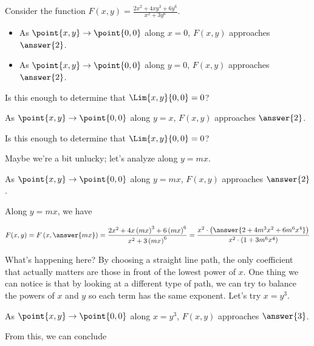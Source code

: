 \documentclass{ximera}
\author{Jim Talamo}
\begin{document}
\begin{exercise}
  Consider the function $F(x,y)= \frac{2x^2+4xy^3+6y^6}{x^2+3y^6}$.
  
  \begin{itemize}
  \item As $\point{x,y} \to \point{0,0}$ along $x=0$, $F(x,y)$ approaches $\answer{2}$.
  \item As $\point{x,y} \to \point{0,0}$ along $y=0$, $F(x,y)$ approaches $\answer{2}$.
  \end{itemize}
  
Is this enough to determine that $\Lim{x,y}{0,0} = 0$? 
   
   \begin{exercise}
As $\point{x,y} \to \point{0,0}$ along $y=x$, $F(x,y)$ approaches $\answer{2}$.
   
  Is this enough to determine that $\Lim{x,y}{0,0} = 0$? 
      
\begin{exercise}
Maybe we're a bit unlucky; let's analyze along $y=mx$.  

As $\point{x,y} \to \point{0,0}$ along $y=mx$, $F(x,y)$ approaches $\answer{2}$.

\begin{hint}
Along $y=mx$, we have 

\[
F(x,y)= F\left(x,\answer{mx}\right) = \frac{2x^2+4x\left(mx\right)^3+6\left(mx\right)^6}{x^2+3\left(mx\right)^6} = \frac{x^2 \cdot \left(\answer{2+4m^3x^2+6m^6x^4} \right) }{x^2 \cdot \left(1 +3m^6x^4 \right) }
\]
\end{hint}
\begin{exercise}

What's happening here?  By choosing a straight line path, the only coefficient that actually matters are those in front of the lowest power of $x$.  One thing we can notice is that by looking at a different type of path, we can try to balance the powers of $x$ and $y$ so each term has the same exponent.  Let's try $x=y^3$.

As $\point{x,y} \to \point{0,0}$ along $x=y^3$, $F(x,y)$ approaches $\answer{3}$.

From this, we can conclude
\begin{multipleChoice}
\end{multipleChoice}


\end{exercise}
\end{exercise}
\end{exercise}
\end{exercise}
\end{document}
